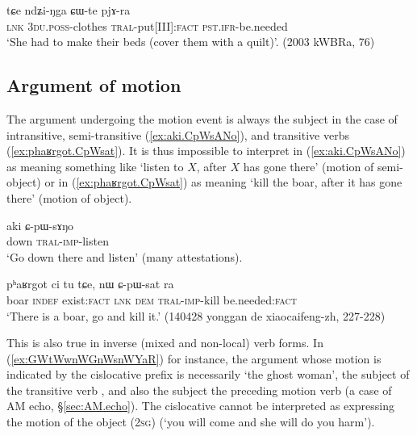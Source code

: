 \begin{exe}
\ex  \label{ex:CWte.pjAra}
 \gll  tɕe ndʑi-ŋga ɕɯ-te pjɤ-ra \\
 \textsc{lnk} \textsc{3du}.\textsc{poss}-clothes \textsc{tral}-put[III]:\textsc{fact} \textsc{pst}.\textsc{ifr}-be.needed \\
 \glt `She had to make their beds (cover them with a quilt)'. (2003 kWBRa, 76)
\end{exe}

\subsection{Argument of motion} \label{sec:AM.argument.motion}

The argument undergoing the motion event is always the subject in the case of intransitive, semi-transitive (\ref{ex:aki.CpWsANo}), and transitive verbs (\ref{ex:phaʁrgot.CpWsat}). It is thus impossible to interpret  in (\ref{ex:aki.CpWsANo}) as meaning something like `listen to $X$, after $X$ has gone there' (motion of semi-object) or  in (\ref{ex:phaʁrgot.CpWsat}) as meaning `kill the boar, after it has gone there' (motion of object).
 
\begin{exe}
\ex  \label{ex:aki.CpWsANo}
 \gll aki ɕ-pɯ-sɤŋo \\
 down \textsc{tral}-\textsc{imp}-listen \\
\glt `Go down there and listen' (many attestations).
\end{exe}

\begin{exe}
\ex  \label{ex:phaʁrgot.CpWsat}
 \gll pʰaʁrgot ci tu tɕe, nɯ ɕ-pɯ-sat ra \\
boar \textsc{indef} exist:\textsc{fact} \textsc{lnk} \textsc{dem} \textsc{tral}-\textsc{imp}-kill be.needed:\textsc{fact} \\
\glt `There is a boar, go and kill it.' (140428 yonggan de xiaocaifeng-zh, 227-228)
\end{exe}

This is also true in inverse (mixed and non-local) verb forms. In (\ref{ex:GWtWwnWGnWsnWYaR}) for instance, the argument whose motion is indicated by the cislocative prefix is necessarily  `the ghost woman', the subject of the transitive verb , and also the subject the preceding motion verb  (a case of AM echo, §\ref{sec:AM.echo}). The cislocative  cannot be interpreted as expressing the motion of the object (\textsc{2sg}) (`you will come and she will do you harm'). 

